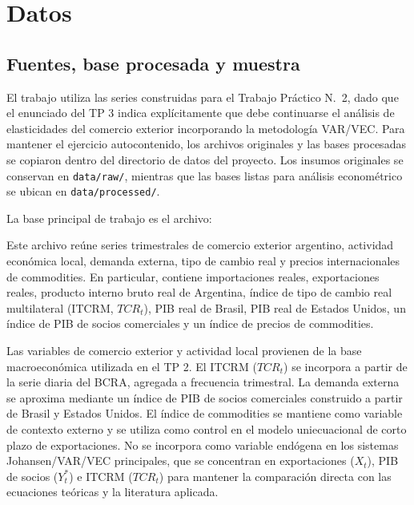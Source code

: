 \documentclass[11pt,a4paper]{article}
\begin{document}
	\section{Datos}
	\label{sec:datos}

	\subsection{Fuentes, base procesada y muestra}
	\label{subsec:datos-fuentes-muestra}

	El trabajo utiliza las series construidas para el Trabajo Práctico
	N.\textdegree~2, dado que el enunciado del TP 3 indica explícitamente que debe
	continuarse el análisis de elasticidades del comercio exterior incorporando la
	metodología VAR/VEC. Para mantener el ejercicio autocontenido, los archivos
	originales y las bases procesadas se copiaron dentro del directorio de datos
	del proyecto. Los insumos originales se conservan en \texttt{data/raw/},
	mientras que las bases listas para análisis econométrico
	se ubican en \texttt{data/processed/}.

	La base principal de trabajo es el archivo:
	\begin{center}
		\small{}
	\end{center}
	Este archivo reúne series trimestrales de comercio exterior argentino, actividad
	económica local, demanda externa, tipo de cambio real y precios internacionales
	de commodities. En particular, contiene importaciones reales, exportaciones
	reales, producto interno bruto real de Argentina, índice de tipo de cambio real
	multilateral (ITCRM, \(TCR_t\)), PIB real de Brasil, PIB real de Estados Unidos, un índice
	de PIB de socios comerciales y un índice de precios de commodities.

	Las variables de comercio exterior y actividad local provienen de la base
	macroeconómica utilizada en el TP 2. El ITCRM (\(TCR_t\)) se incorpora a partir de la serie
	diaria del BCRA, agregada a frecuencia trimestral. La demanda externa se aproxima
	mediante un índice de PIB de socios comerciales construido a partir de Brasil y
	Estados Unidos. El índice de commodities se mantiene como variable de contexto
	externo y se utiliza como control en el modelo uniecuacional de corto plazo de
	exportaciones. No se incorpora como variable endógena en los sistemas
	Johansen/VAR/VEC principales, que se concentran en exportaciones (\(X_t\)), PIB
	de socios (\(Y_t^*\)) e ITCRM (\(TCR_t\)) para mantener la comparación directa
	con las ecuaciones teóricas y la literatura aplicada.
\end{document}
